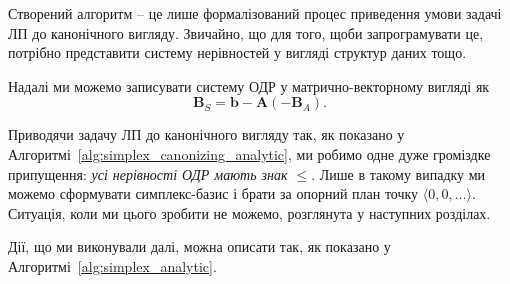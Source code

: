 \documentclass[\main/book.tex]{subfiles}
\begin{document}
\begin{algorithm}
\begin{algorithmic}
  \State {}
 \EndFunction
\end{algorithmic}
\end{algorithm}

Створений алгоритм -- це лише формалізований процес приведення умови задачі ЛП до канонічного вигляду. Звичайно, що для того, щоби запрограмувати це, потрібно представити систему нерівностей у вигляді структур даних тощо.

Надалі ми можемо записувати систему ОДР у матрично-векторному вигляді як
\[
 \mathbf{B}_S = \mathbf{b} - \mathbf{A} (- \mathbf{B}_A)
 \text{.}
\]

\begin{note}
 Приводячи задачу ЛП до канонічного вигляду так, як показано у Алгоритмі~\ref{alg:simplex_canonizing_analytic}, ми робимо одне дуже громіздке припущення: \textit{усі нерівності ОДР мають знак \flqq{}$\leq$\frqq{}}. Лише в такому випадку ми можемо сформувати симплекс-базис і брати за опорний план точку $\langle 0, 0, \ldots \rangle$. Ситуація, коли ми цього зробити не можемо, розглянута у наступних розділах.
\end{note}

Дії, що ми виконували далі, можна описати так, як показано у Алгоритмі~\ref{alg:simplex_analytic}.
\end{document}
